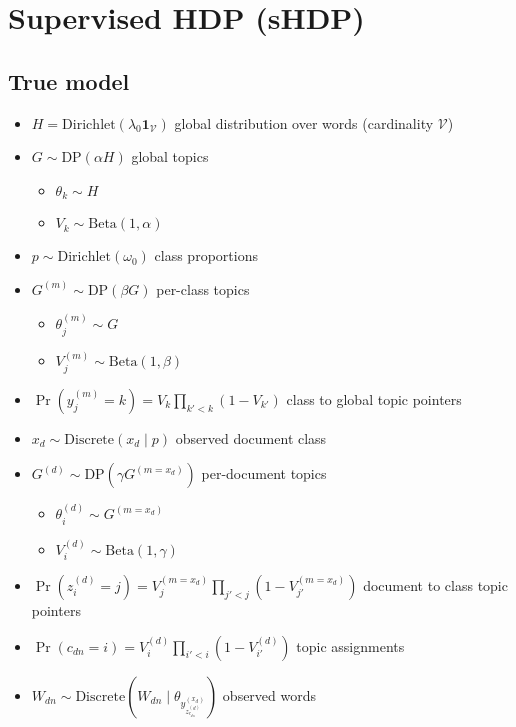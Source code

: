 \documentclass{article}
\newcommand{\Beta}{\ensuremath{\mathrm{Beta}}}
\newcommand{\Dirichlet}{\ensuremath{\mathrm{Dirichlet}}}
\newcommand{\Discrete}{\ensuremath{\mathrm{Discrete}}}
\newcommand{\DP}{\ensuremath{\mathrm{DP}}}
\newcommand{\V}{\ensuremath{\mathcal{V}}}
\newcommand{\one}{\ensuremath{\mathbf{1}}}
\begin{document}
\section*{Supervised HDP (sHDP)}

\subsection*{True model}

\begin{itemize}
\item $\displaystyle H = \Dirichlet\left(\lambda_0 \one_\V\right)$ global distribution over words (cardinality $\V$)
\item $G \sim \DP\left(\alpha H\right)$ global topics
    \begin{itemize}
    \item $\theta_k \sim H$
    \item $V_k \sim \Beta(1, \alpha)$
    \end{itemize}
\item $p \sim \Dirichlet(\omega_0)$ class proportions
\item $G^{(m)} \sim \DP\left(\beta G\right)$ per-class topics
    \begin{itemize}
    \item $\theta_j^{(m)} \sim G$
    \item $V_j^{(m)} \sim \Beta(1, \beta)$
    \end{itemize}
\item $\Pr(y_j^{(m)} = k) = V_k \prod_{k'<k} (1 - V_{k'})$ class to global topic pointers
\item $x_d \sim \Discrete(x_d \mid p)$ observed document class
\item $G^{(d)} \sim \DP\left(\gamma G^{(m=x_d)}\right)$ per-document topics
    \begin{itemize}
    \item $\theta_i^{(d)} \sim G^{(m=x_d)}$
    \item $V_i^{(d)} \sim \Beta(1, \gamma)$
    \end{itemize}
\item $\Pr(z_i^{(d)} = j) = V_j^{(m=x_d)} \prod_{j'<j} (1 - V_{j'}^{(m=x_d)})$ document to class topic pointers
\item $\Pr(c_{dn} = i) = V_i^{(d)} \prod_{i'<i} (1 - V_{i'}^{(d)})$ topic assignments
\item $W_{dn} \sim \Discrete(W_{dn} \mid \theta_{y^{(x_d)}_{z^{(d)}_{c_{dn}}}})$ observed words
\end{itemize}
\end{document}
